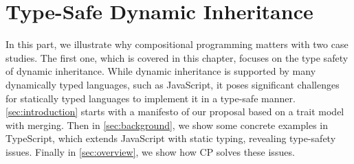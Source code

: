 \chapter{Type-Safe Dynamic Inheritance} \label{ch:inheritance}

In this part, we illustrate why compositional programming matters with two case
studies. The first one, which is covered in this chapter, focuses on the type
safety of dynamic inheritance. While dynamic inheritance is supported by many
dynamically typed languages, such as JavaScript, it poses significant challenges
for statically typed languages to implement it in a type-safe manner.
\autoref{sec:introduction} starts with a manifesto of our proposal based on a
trait model with merging. Then in \autoref{sec:background}, we show some
concrete examples in TypeScript, which extends JavaScript with static typing,
revealing type-safety issues. Finally in \autoref{sec:overview}, we show how CP
solves these issues. %




